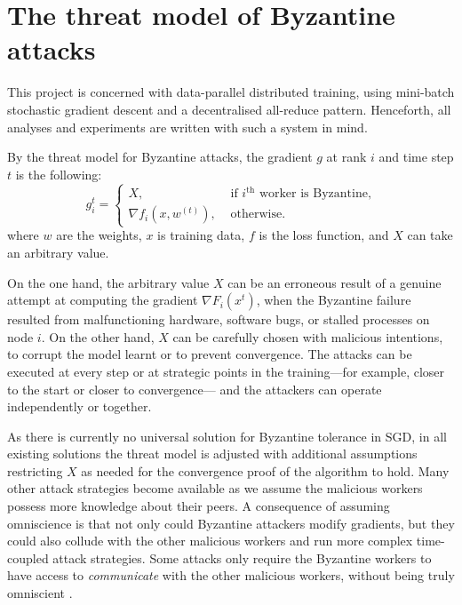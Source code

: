 \documentclass{article}
\begin{document}
\section{The threat model of Byzantine attacks}

This project is concerned with data-parallel distributed training, using mini-batch stochastic gradient descent and a decentralised all-reduce pattern. Henceforth, all analyses and experiments are written with such a system in mind.

By the threat model for Byzantine attacks, the gradient $g$ at rank $i$ and time step $t$ is the following:
\begin{equation}
g_{i}^{t}= \begin{cases}X, & \text { if } i^\text{th} \text { worker is Byzantine,} \\ \nabla f_i \left(x, w^{(t)}\right), & \text { otherwise. }\end{cases}
\end{equation}
where $w$ are the weights, $x$ is training data, $f$ is the loss function, and $X$ can take an arbitrary value.

On the one hand, the arbitrary value $X$ can be an erroneous result of a genuine attempt at computing the gradient $\nabla F_{i}\left(x^t\right)$, when the Byzantine failure resulted from malfunctioning hardware, software bugs, or stalled processes on node $i$. 
On the other hand, $X$ can be carefully chosen with malicious intentions, to corrupt the model learnt or to prevent convergence. The attacks can be executed at every step or at strategic points in the training---for example, closer to the start or closer to convergence--- and the attackers can operate independently or together.

As there is currently no universal solution for Byzantine tolerance in SGD, in all existing solutions the threat model is adjusted with additional assumptions restricting $X$ as needed for the convergence proof of the algorithm to hold. Many other attack strategies become available as we assume the malicious workers possess more knowledge about their peers. A consequence of assuming omniscience is that not only could Byzantine attackers modify gradients, but they could also collude with the other malicious workers and run more complex time-coupled attack strategies. Some attacks only require the Byzantine workers to have access to \textit{communicate} with the other malicious workers, without being truly omniscient \citep{baruch2019little, xie2020fall}. 
\end{document}
